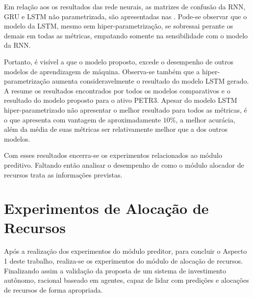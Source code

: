 

Em relação aos os resultados das rede neurais, as matrizes de confusão da \acrshort{RNN}, \acrshort{GRU} e \acrshort{LSTM} não parametrizada, são apresentadas nas . Pode-se observar que o modelo da \acrshort{LSTM}, mesmo sem hiper-parametrização, se sobressai perante os demais em todas as métricas, empatando somente na sensibilidade com o modelo da \acrshort{RNN}.




Portanto, é visível a que o modelo proposto, excede o desempenho de outros modelos de aprendizagem de máquina. Observa-se também que a hiper-parametrização aumenta consideravelmente o resultado do modelo \acrshort{LSTM} gerado. A  resume os resultados encontrados por todos os modelos comparativos e o resultado do modelo proposto para o ativo PETR3. Apesar do modelo LSTM hiper-parametrizado não apresentar o melhor resultado para todos as métricas, é o que apresenta com vantagem de aproximadamente $10\%$, a melhor acurácia, além da média de suas métricas ser relativamente melhor que a dos outros modelos.



Com esses resultados encerra-se os experimentos relacionados ao módulo preditivo. Faltando então analisar o desempenho de como o módulo alocador de recursos trata as informações previstas.

\section{Experimentos de Alocação de Recursos}
\label{exp:mar}

Após a realização dos experimentos do módulo preditor, para concluir o Aspecto 1 deste trabalho, realiza-se os experimentos do módulo de alocação de recursos. Finalizando assim a validação da proposta de um sistema de investimento autônomo, racional baseado em agentes, capaz de lidar com predições e alocações de recursos de forma apropriada. 

